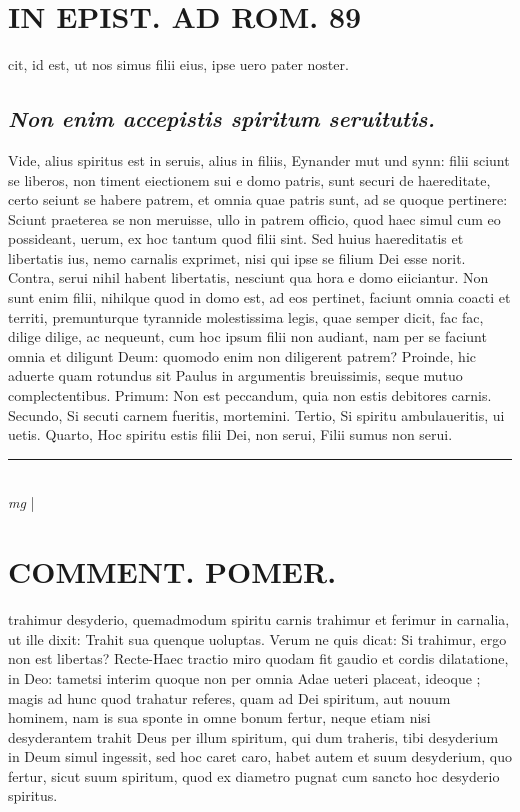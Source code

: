 \documentclass{article}
\begin{document}
\begin{pages}
\section*{IN EPIST. AD ROM.  89 }
\marginpar{[ p.]}\pstart cit, id est, ut nos simus filii eius, ipse uero pater noster.  \pend
{}
{}
\subsection*{\textit{Non enim accepistis spiritum seruitutis. }}\pstart Vide, alius spiritus est in seruis, alius in filiis, Eynander mut und synn: filii sciunt se liberos, non timent eiectionem sui e domo patris, sunt securi de haereditate, certo seiunt se habere patrem, et omnia quae patris sunt, ad se quoque pertinere: Sciunt praeterea se non meruisse, ullo in patrem officio, quod haec simul cum eo possideant, uerum, ex hoc tantum quod filii sint. Sed huius haereditatis et libertatis ius, nemo carnalis exprimet, nisi qui ipse se filium Dei esse norit.  Contra, serui nihil habent libertatis, nesciunt qua hora e domo eiiciantur. Non sunt enim filii, nihilque quod in domo est, ad eos pertinet, faciunt omnia coacti et territi, premunturque tyrannide molestissima legis, quae semper dicit, fac fac, dilige dilige, ac nequeunt, cum hoc ipsum filii non audiant, nam per se faciunt omnia et diligunt Deum: quomodo enim non diligerent patrem? Proinde, hic aduerte quam rotundus sit Paulus in argumentis breuissimis, seque mutuo complectentibus. Primum: Non est peccandum, quia non estis debitores carnis. Secundo, Si secuti carnem fueritis, mortemini. Tertio, Si spiritu ambulaueritis, ui uetis. Quarto, Hoc spiritu estis filii Dei, non serui, Filii sumus non serui.   \pend
\vspace{0.5cm}\noindent
\vspace{0.2cm}\rule{1cm}{0.2pt}\\ 
\hspace{0.2cm}\textit{mg}
\footnotesize 
\normalsize| 
\section*{COMMENT. POMER.  }\pstart trahimur desyderio, quemadmodum spiritu carnis trahimur et ferimur in carnalia, ut ille dixit: Trahit sua quenque uoluptas. Verum ne quis dicat: Si trahimur, ergo non est libertas? Recte-Haec tractio miro quodam fit gaudio et cordis dilatatione, in Deo: tametsi interim quoque non per omnia Adae ueteri placeat, ideoque ; magis ad hunc quod trahatur referes, quam ad Dei spiritum, aut nouum hominem, nam is sua sponte in omne bonum fertur, neque etiam nisi desyderantem trahit Deus per illum spiritum, qui dum traheris, tibi desyderium in Deum simul ingessit, sed hoc caret caro, habet autem et suum desyderium, quo fertur, sicut suum spiritum, quod ex diametro pugnat cum sancto hoc desyderio spiritus.   \pend
{}
{}

\end{pages}
\end{document}
